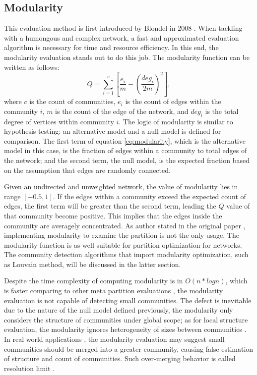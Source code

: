 \documentclass[12pt]{article}
\begin{document}
\subsection{Modularity}

This evaluation method is first introduced by Blondel in 2008 \cite{12}. When tackling with a humongous and complex network, a fast and approximated evaluation algorithm is necessary for time and resource efficiency. In this end, the modularity evaluation stands out to do this job. The modularity function \cite{13} can be written as follows:
\begin{equation}\label{eq:modularity}
Q = \sum_{i=1}^c \left[  \frac{e_i}{m} - \left( \frac{deg_i}{2m} \right)^2  \right],
\end{equation}
where $c$ is the count of communities, $e_i$ is the count of edges within the community $i$, $m$ is the count of the edge of the network, and $deg_i$ is the total degree of vertices within community $i$. The logic of modularity is similar to hypothesis testing: an alternative model and a null model is defined for comparison. The first term of equation \eqref{eq:modularity}, which is the alternative model in this case, is the fraction of edges within a community to total edges of the network; and the second term, the null model, is the expected fraction based on the assumption that edges are randomly connected.

\bigbreak

Given an undirected and unweighted network, the value of modularity lies in range $[-0.5, 1]$. If the edges within a community exceed the expected count of edges, the first term will be greater than the second term, leading the $Q$ value of that community become positive. This implies that the edges inside the community are averagely concentrated. As author stated in the original paper \cite{12}, implementing modularity to examine the partition is not the only usage. The modularity function is as well suitable for partition optimization for  networks. The community detection algorithms that import modularity optimization, such as Louvain method, will be discussed in the latter section.

\bigbreak

Despite the time complexity of computing modularity is in $O(n*log n)$, which is faster comparing to other meta partition evaluations \cite{2, 12}, the modularity evaluation is not capable of detecting small communities. The defect is inevitable due to the nature of the null model defined previously, the modularity only considers the structure of communities under global scope; as for local structure evaluation, the modularity ignores heterogeneity of sizes between communities \cite{13}. In real world applications \cite{9, 10}, the modularity evaluation may suggest small communities should be merged into a greater community, causing false estimation of structure and count of communities. Such over-merging behavior is called resolution limit \cite{13}.
\end{document}
